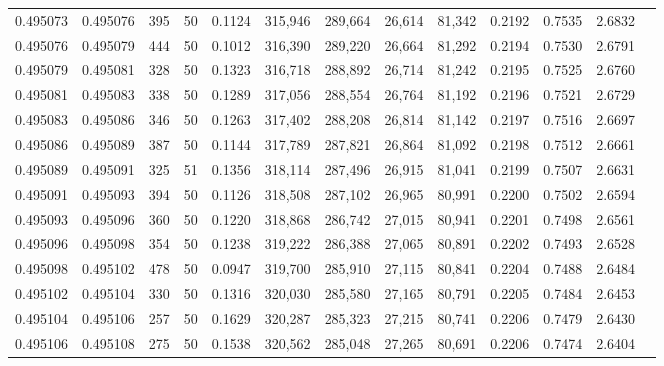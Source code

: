 \begin{tabular}{rrrrrrrrrrrrr}
0.495073 & 0.495076 &   395 &  50 &                                     0.1124 & 315,946 & 289,664 &  26,614 &  81,342 & 0.2192 & 0.7535 & 2.6832 \\
0.495076 & 0.495079 &   444 &  50 &                                     0.1012 & 316,390 & 289,220 &  26,664 &  81,292 & 0.2194 & 0.7530 & 2.6791 \\
0.495079 & 0.495081 &   328 &  50 &                                     0.1323 & 316,718 & 288,892 &  26,714 &  81,242 & 0.2195 & 0.7525 & 2.6760 \\
0.495081 & 0.495083 &   338 &  50 &                                     0.1289 & 317,056 & 288,554 &  26,764 &  81,192 & 0.2196 & 0.7521 & 2.6729 \\
0.495083 & 0.495086 &   346 &  50 &                                     0.1263 & 317,402 & 288,208 &  26,814 &  81,142 & 0.2197 & 0.7516 & 2.6697 \\
0.495086 & 0.495089 &   387 &  50 &                                     0.1144 & 317,789 & 287,821 &  26,864 &  81,092 & 0.2198 & 0.7512 & 2.6661 \\
0.495089 & 0.495091 &   325 &  51 &                                     0.1356 & 318,114 & 287,496 &  26,915 &  81,041 & 0.2199 & 0.7507 & 2.6631 \\
0.495091 & 0.495093 &   394 &  50 &                                     0.1126 & 318,508 & 287,102 &  26,965 &  80,991 & 0.2200 & 0.7502 & 2.6594 \\
0.495093 & 0.495096 &   360 &  50 &                                     0.1220 & 318,868 & 286,742 &  27,015 &  80,941 & 0.2201 & 0.7498 & 2.6561 \\
0.495096 & 0.495098 &   354 &  50 &                                     0.1238 & 319,222 & 286,388 &  27,065 &  80,891 & 0.2202 & 0.7493 & 2.6528 \\
0.495098 & 0.495102 &   478 &  50 &                                     0.0947 & 319,700 & 285,910 &  27,115 &  80,841 & 0.2204 & 0.7488 & 2.6484 \\
0.495102 & 0.495104 &   330 &  50 &                                     0.1316 & 320,030 & 285,580 &  27,165 &  80,791 & 0.2205 & 0.7484 & 2.6453 \\
0.495104 & 0.495106 &   257 &  50 &                                     0.1629 & 320,287 & 285,323 &  27,215 &  80,741 & 0.2206 & 0.7479 & 2.6430 \\
0.495106 & 0.495108 &   275 &  50 &                                     0.1538 & 320,562 & 285,048 &  27,265 &  80,691 & 0.2206 & 0.7474 & 2.6404 \\

\end{tabular}
